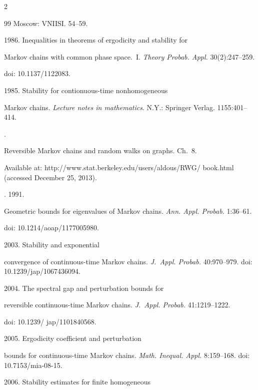\begin{multicols}{2}
{{\begin{thebibliography}{99}
Moscow: VNIISI. 54--59.


 1986. Inequalities in theorems of ergodicity and stability for

Markov chains with common phase space.~I. \textit{Theory Probab. Appl.} 30(2):247--259.

doi: 10.1137/1122083.


 1985. Stability for contionuous-time nonhomogeneous

Markov chains. \textit{Lecture notes in mathematics}.  N.Y.: Springer Verlag. 1155:401--414.


.

Reversible Markov chains and random walks on graphs. Ch.~8.

Available at: {\sf http://www.stat.berkeley.edu/users/aldous/RWG/ book.html} (accessed December 25, 2013).


. 1991.

Geometric bounds for eigenvalues of Markov chains. \textit{Ann. Appl. Probab.} 1:36--61.

doi: 10.1214/aoap/1177005980.


 2003. Stability and exponential

convergence of continuous-time Markov chains. \textit{J.~Appl. Probab.} 40:970--979. doi: 10.1239/jap/1067436094.


 2004. The spectral gap and perturbation bounds for

reversible continuous-time Markov chains. \textit{J.~Appl. Probab.} 41:1219--1222. 

doi: 10.1239/ jap/1101840568.


 2005. Ergodicity coefficient and perturbation

bounds for continuous-time Markov chains. \textit{Math. Inequal. Appl.} 8:159--168. doi: 10.7153/mia-08-15.


 2006. Stability estimates for finite homogeneous


\end{thebibliography}}}
\end{multicols}
